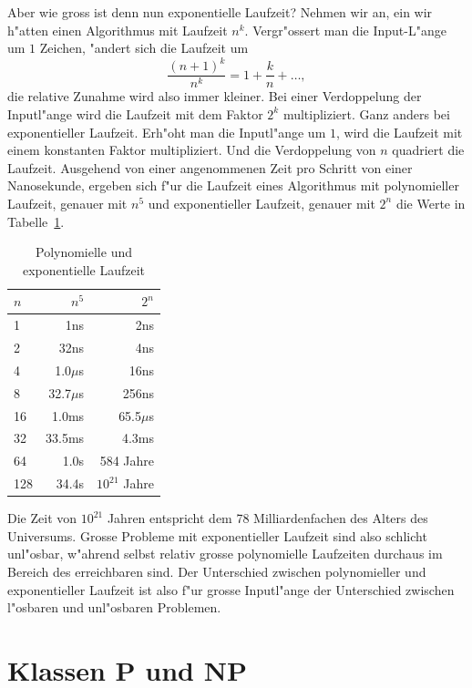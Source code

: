 Aber wie gross ist denn nun exponentielle Laufzeit?
Nehmen wir an,
ein wir h"atten einen Algorithmus mit Laufzeit $n^k$. Vergr"ossert
man die Input-L"ange um $1$ Zeichen, "andert sich die Laufzeit um
\[
\frac{(n+1)^k}{n^k}
=
1+\frac{k}{n} +\dots,
\]
die relative Zunahme wird also immer kleiner. Bei einer Verdoppelung
der Inputl"ange wird die Laufzeit mit dem Faktor $2^k$ multipliziert.
Ganz anders bei exponentieller Laufzeit.
Erh"oht man die Inputl"ange um $1$, wird die Laufzeit mit einem
konstanten Faktor multipliziert. Und die Verdoppelung von $n$
quadriert die Laufzeit.
Ausgehend von einer angenommenen
Zeit pro Schritt von einer Nanosekunde, ergeben sich
f"ur die Laufzeit eines Algorithmus
mit polynomieller Laufzeit, genauer mit $n^5$ und exponentieller Laufzeit,
genauer mit $2^n$ die Werte in Tabelle~\ref{laufzeittabelle}.
\begin{table}
\begin{center}
\begin{tabular}{|l|rr|}
\hline
$n$&$n^5$&$2^n$\\
\hline
  1&             1ns&             2ns\\
  2&            32ns&             4ns\\
  4&       1.0$\mu$s&            16ns\\
  8&      32.7$\mu$s&           256ns\\
 16&           1.0ms&      65.5$\mu$s\\
 32&          33.5ms&           4.3ms\\
 64&            1.0s&       584 Jahre\\
128&           34.4s& $10^{21}$ Jahre\\
\hline
\end{tabular}
\end{center}
\caption{Polynomielle und exponentielle Laufzeit\label{laufzeittabelle}}
\end{table}
Die Zeit von $10^{21}$ Jahren entspricht dem 78 Milliardenfachen des
Alters des Universums. Grosse Probleme mit exponentieller Laufzeit
sind also schlicht unl"osbar, w"ahrend selbst relativ grosse
polynomielle Laufzeiten durchaus im Bereich des erreichbaren sind.
Der Unterschied zwischen polynomieller und exponentieller Laufzeit
ist also f"ur grosse Inputl"ange der Unterschied zwischen l"osbaren und
unl"osbaren Problemen.

\section{Klassen P und NP}
